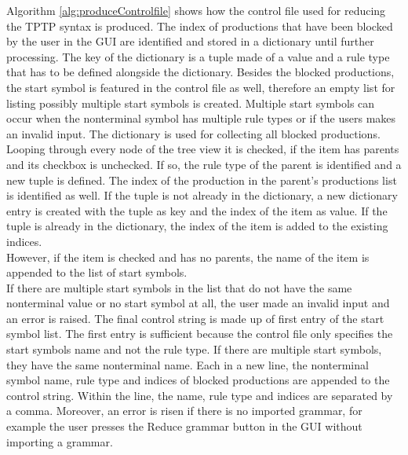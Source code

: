 Algorithm \ref{alg:produceControlfile} shows how the control file used for reducing the \ac{TPTP} syntax is produced.
The index of productions that have been blocked by the user in the GUI are identified and stored in a dictionary until further processing.
The key of the dictionary is a tuple made of a value and a rule type that has to be defined alongside the dictionary.
Besides the blocked productions, the start symbol is featured in the control file as well, therefore an empty list for listing possibly multiple start symbols is created.
Multiple start symbols can occur when the nonterminal symbol has multiple rule types or if the users makes an invalid input. The dictionary is used for collecting all blocked productions. Looping through every node of the tree view it is checked, if the item has parents and its checkbox is unchecked. If so, the rule type of the parent is identified and a new tuple is defined. The index of the production in the parent's productions list is identified as well. If the tuple is not already in the dictionary, a new dictionary entry is created with the tuple as key and the index of the item as value. If the tuple is already in the dictionary, the index of the item is added to the existing indices. \\
However, if the item is checked and has no parents, the name of the item is appended to the list of start symbols. \\
If there are multiple start symbols in the list that do not have the same nonterminal value or no start symbol at all, the user made an invalid input and an error is raised. 
The final control string is made up of first entry of the start symbol list. The first entry is sufficient because the control file only specifies the start symbols name and not the rule type.
If there are multiple start symbols, they have the same nonterminal name. 
Each in a new line, the nonterminal symbol name, rule type and indices of blocked productions are appended to the control string. Within the line, the name, rule type and indices are separated by a comma.
Moreover, an error is risen if there is no imported grammar, for example the user presses the Reduce grammar button in the GUI without importing a grammar.

